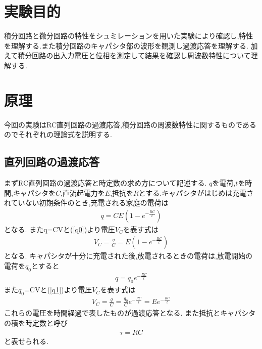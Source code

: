 \documentclass[a4j,10pt,dvipdfmx]{jarticle}
\author{学籍番号2120029, 氏名 政野玄空}
\date{2023年5月11日}
\begin{document}
\section{実験目的}
積分回路と微分回路の特性をシュミレーションを用いた実験により確認し,特性を理解する.また積分回路のキャパシタ部の波形を観測し過渡応答を理解する.
加えて積分回路の出入力電圧と位相を測定して結果を確認し周波数特性について理解する.
\section{原理}
今回の実験はRC直列回路の過渡応答,積分回路の周波数特性に関するものであるのでそれぞれの理論式を説明する.
\subsection{直列回路の過渡応答}

まずRC直列回路の過渡応答と時定数の求め方について記述する.
$q$を電荷,$t$を時間,キャパシタを$C$,直流起電力を$E$,抵抗を$R$とする.キャパシタがはじめは充電されていない初期条件のとき,充電される家庭の電荷は
\begin{eqnarray}
  \label{q0}
q=CE(1-e^{-\frac{RC}{t}})
\end{eqnarray}
となる.
またq=CVと(\ref{q0})より電圧$V_C$を表す式は
\begin{eqnarray}
  \label{Vc}
V_C=\frac{q}{C}=E(1-e^{-\frac{RC}{t}})
\end{eqnarray}
となる.
キャパシタが十分に充電された後,放電されるときの電荷は,放電開始の電荷を$q_0$とすると
\begin{eqnarray}
  \label{q1}
q=q_0e^{-\frac{RC}{t}}
\end{eqnarray}
また$q_0$=CVと(\ref{q1})より電圧$V_C$を表す式は
\begin{eqnarray}
  \label{Vc2}
V_C=\frac{q}{C}=\frac{q_0}{C}e^{-\frac{RC}{t}}=Ee^{-\frac{RC}{t}}
\end{eqnarray}
これらの電圧を時間経過で表したものが過渡応答となる.
また抵抗とキャパシタの積を時定数と呼び
\begin{eqnarray}
  \label{t}
τ=RC
\end{eqnarray}
と表せられる.
\end{document}
